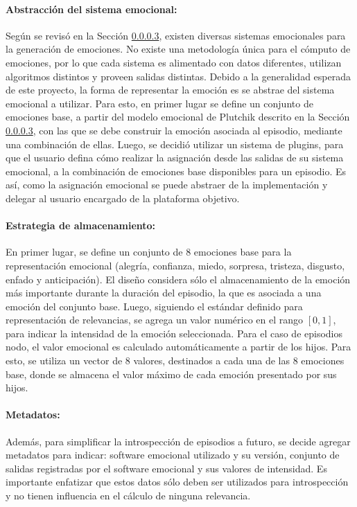 \paragraph{Abstracción del sistema emocional:}
Según se revisó en la Sección \ref{}, existen diversas sistemas emocionales para la generación de emociones. No existe una metodología única para el cómputo de emociones, por lo que cada sistema es alimentado con datos diferentes, utilizan algoritmos distintos y proveen salidas distintas. Debido a la generalidad esperada de este proyecto, la forma de representar la emoción es se abstrae del sistema emocional a utilizar. Para esto, en primer lugar se define un conjunto de emociones base, a partir del modelo emocional de Plutchik descrito en la Sección \ref{}, con las que se debe construir la emoción asociada al episodio, mediante una combinación de ellas. Luego, se decidió utilizar un sistema de plugins, para que el usuario defina cómo realizar la asignación desde las salidas de su sistema emocional, a la combinación de emociones base disponibles para un episodio. Es así, como la asignación emocional se puede  abstraer de la implementación y delegar al usuario encargado de la plataforma objetivo.


\paragraph{Estrategia de almacenamiento:}
En primer lugar, se define un conjunto de 8 emociones base para la representación emocional (alegría, confianza, miedo, sorpresa, tristeza, disgusto, enfado y anticipación). El diseño considera sólo el almacenamiento de la emoción más importante durante la duración del episodio, la que es asociada a una emoción del conjunto base. Luego, siguiendo el estándar definido para representación de relevancias, se agrega un valor numérico en el rango $[0, 1]$, para  indicar la intensidad de la emoción seleccionada. Para el caso de episodios nodo, el valor emocional es calculado automáticamente a partir de los hijos. Para esto, se utiliza un vector de 8 valores, destinados a cada una de las 8 emociones base, donde se almacena el valor máximo de cada emoción presentado por sus hijos.

\paragraph{Metadatos:}
Además, para simplificar la introspección de episodios a futuro, se decide agregar metadatos para indicar: software emocional utilizado y su versión, conjunto de salidas registradas por el software emocional y sus valores de intensidad. Es importante enfatizar que estos datos sólo deben ser utilizados para introspección y no tienen influencia en el cálculo de ninguna relevancia.

